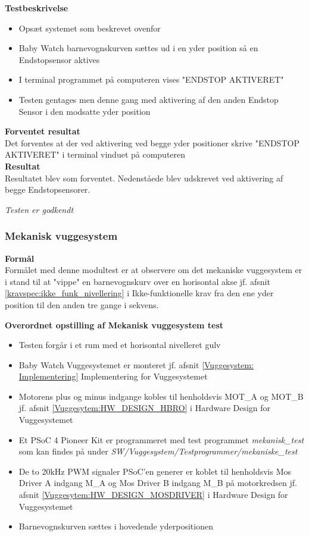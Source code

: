 \textbf{Testbeskrivelse}
\begin{itemize}
	\item Opsæt systemet som beskrevet ovenfor
	\item Baby Watch barnevognskurven sættes ud i en yder position så en Endstopsensor aktives
	\item I terminal programmet på computeren vises "ENDSTOP AKTIVERET"
	\item Testen gentages men denne gang med aktivering af den anden Endstop Sensor i den modsatte yder position
\end{itemize}

\textbf{Forventet resultat} \\
Det forventes at der ved aktivering ved begge yder positioner skrive "ENDSTOP AKTIVERET" i terminal vinduet på computeren \\
\textbf{Resultat} \\
Resultatet blev som forventet. Nedenståede blev udskrevet ved aktivering af begge Endstopsensorer.\\


\textit{Testen er godkendt}



\subsubsection{Mekanisk vuggesystem}
\textbf{Formål} \\
Formålet med denne modultest er at observere om det mekaniske vuggesystem er i stand til at "vippe" en barnevognskurv over en horisontal akse jf. afsnit \vref{kravspec:ikke_funk_nivellering} i Ikke-funktionelle krav fra den ene yder position til den anden tre gange i sekvens. 

\textbf{Overordnet opstilling af Mekanisk vuggesystem test}

\begin{itemize}
	\item Testen forgår i et rum med et horisontal nivelleret gulv
	\item Baby Watch Vuggesystemet er monteret jf. afsnit \ref{Vuggesystem: Implementering} Implementering for Vuggesystemet
	\item Motorens plus og minus indgange kobles til henholdsvis MOT\_A og MOT\_B jf. afsnit \ref{Vuggesytem:HW_DESIGN_HBRO} i Hardware Design for Vuggesystemet
	\item Et PSoC 4 Pioneer Kit \citep{website:Cypress} er programmeret med test programmet \textit{mekanisk\_test} som kan findes på \citep{cd} under \textit{SW/Vuggesystem/Testprogrammer/mekaniske\_test}
	\item De to 20kHz PWM signaler PSoC'en generer er koblet til henholdsvis Mos Driver A indgang M\_A og Mos Driver B indgang M\_B på motorkredsen jf. afsnit \vref{Vuggesytem:HW_DESIGN_MOSDRIVER} i Hardware Design for Vuggesystemet
	\item Barnevognskurven sættes i hovedende yderpositionen
\end{itemize}


